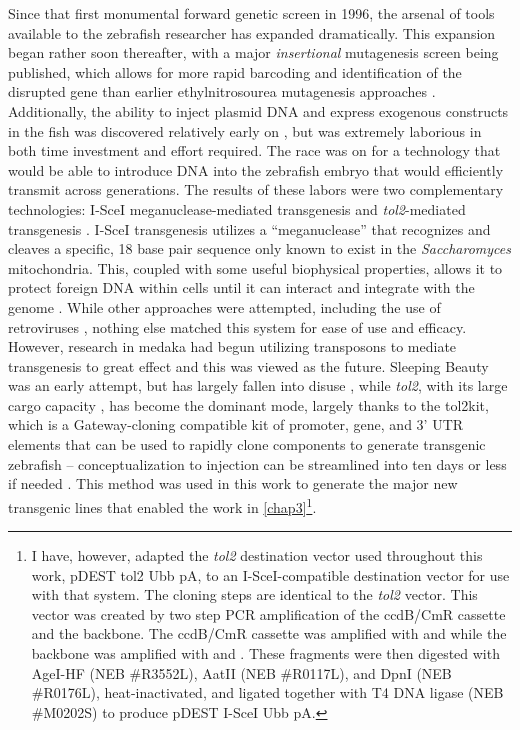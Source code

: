 Since that first monumental forward genetic screen in 1996, the arsenal of tools available to the zebrafish researcher has expanded dramatically. This expansion began rather soon thereafter, with a major \textit{insertional} mutagenesis screen being published, which allows for more rapid barcoding and identification of the disrupted gene than earlier ethylnitrosourea mutagenesis approaches \citep{Amsterdam1999}. Additionally, the ability to inject plasmid DNA and express exogenous constructs in the fish was discovered relatively early on \citep{Stuart1988, Lele1996}, but was extremely laborious in both time investment and effort required. The race was on for a technology that would be able to introduce DNA into the zebrafish embryo that would efficiently transmit across generations. The results of these labors were two complementary technologies: I\hyp{}SceI meganuclease\hyp{}mediated transgenesis \citep{Thermes2002} and \textit{tol2}\hyp{}mediated transgenesis \citep{Kwan2007}. I\hyp{}SceI transgenesis utilizes a ``meganuclease'' that recognizes and cleaves a specific, 18 base pair sequence only known to exist in the \textit{Saccharomyces} mitochondria. This, coupled with some useful biophysical properties, allows it to protect foreign DNA within cells until it can interact and integrate with the genome \citep{Soroldoni2009, Grabher2004}. While other approaches were attempted, including the use of retroviruses \citep{Kurita2004}, nothing else matched this system for ease of use and efficacy. However, research in medaka had begun utilizing transposons to mediate transgenesis to great effect and this was viewed as the future. Sleeping Beauty was an early attempt, but has largely fallen into disuse \citep{Davidson2003}, while \textit{tol2}, with its large cargo capacity \citep{Balciunas2006}, has become the dominant mode, largely thanks to the tol2kit, which is a Gateway\hyp{}cloning compatible kit of promoter, gene, and 3' UTR elements that can be used to rapidly clone components to generate transgenic zebrafish -- conceptualization to injection can be streamlined into ten days or less if needed \citep{Kwan2007}. This method was used in this work to generate the major new transgenic lines that enabled the work in \autoref{chap3}\footnote{I have, however, adapted the \textit{tol2} destination vector used throughout this work, pDEST tol2 Ubb pA, to an I\hyp{}SceI\hyp{}compatible destination vector for use with that system. The cloning steps are identical to the \textit{tol2} vector. This vector was created by two step PCR amplification of the ccdB/CmR cassette and the backbone. The ccdB/CmR cassette was amplified with  and  while the backbone was amplified with  and . These fragments were then digested with AgeI\hyp{}HF (NEB \#R3552L), AatII (NEB \#R0117L), and DpnI (NEB \#R0176L), heat\hyp{}inactivated, and ligated together with T4 DNA ligase (NEB \#M0202S) to produce pDEST I\hyp{}SceI Ubb pA.}.

